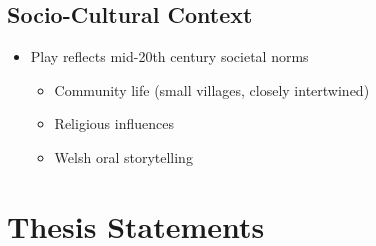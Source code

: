 	\subsection{Socio-Cultural Context}

		\begin{itemize}
			\item Play reflects mid-20th century societal norms
				\begin{itemize}
					\item Community life (small villages, closely intertwined)
					\item Religious influences
					\item Welsh oral storytelling
				\end{itemize}
		\end{itemize}

\section{Thesis Statements} \label{08/05/2025}

